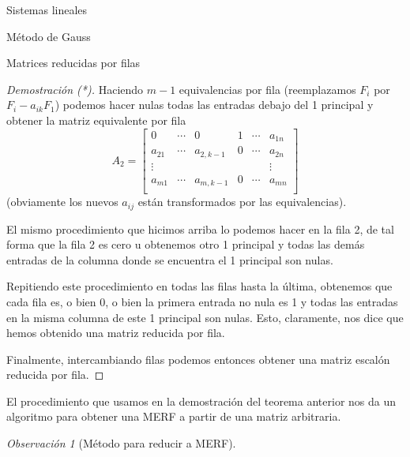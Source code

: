 \documentclass[a4paper,12pt,twoside,spanish,reqno]{amsbook}
\numberwithin{equation}{section}
\theoremstyle{definition}
\theoremstyle{remark}
\newtheorem{observacion}[teorema]{Observaci\'on}
\begin{document}
\begin{chapter}{Sistemas lineales}
\begin{section}{Método de Gauss }
\begin{subsection}{Matrices reducidas por filas}
\begin{proof}[Demostración (*)]
                    Haciendo $m-1$ equivalencias por fila (reemplazamos $F_i$ por $F_i - a_{ik}F_1$) podemos hacer nulas todas las entradas debajo del  1 principal y obtener la matriz equivalente por fila
                    \begin{equation*}
                    A_2 = \begin{bmatrix}
                    0 & \cdots & 0 & 1 & \cdots & a_{1n} \\
                    a_{21}& \cdots & a_{2,k-1} & 0 & \cdots & a_{2n} \\
                    \vdots&  &  &  &  & \vdots \\
                    a_{m1}& \cdots & a_{m,k-1} &0 & \cdots & a_{mn} \\
                    \end{bmatrix}
                    \end{equation*}
                    (obviamente los nuevos $a_{ij}$ están transformados por las equivalencias).
                    
                    El mismo procedimiento que hicimos arriba lo podemos hacer en la fila 2,  de tal forma que la fila 2 es cero u obtenemos otro 1 principal y todas las demás entradas de la columna donde se encuentra el 1 principal son nulas. 
                    
                    Repitiendo este procedimiento en todas las filas hasta la última, obtenemos que cada fila es, o bien 0, o bien la primera entrada no nula es  1 y todas las entradas en la misma columna de este 1 principal son nulas.   Esto, claramente, nos dice que hemos obtenido una matriz reducida por fila.  
                    
                 Finalmente, intercambiando filas podemos entonces obtener una matriz escalón reducida por fila.

                    
                \end{proof}
                
                El procedimiento que usamos en la demostración del teorema anterior nos da un algoritmo para obtener una MERF a partir de una matriz arbitraria.
                
                \begin{observacion}[\sc Método para reducir a MERF] \label{metodo-merf}  
                    \
                                    

\end{observacion}
\end{subsection}
\end{section}
\end{chapter}
\end{document}
